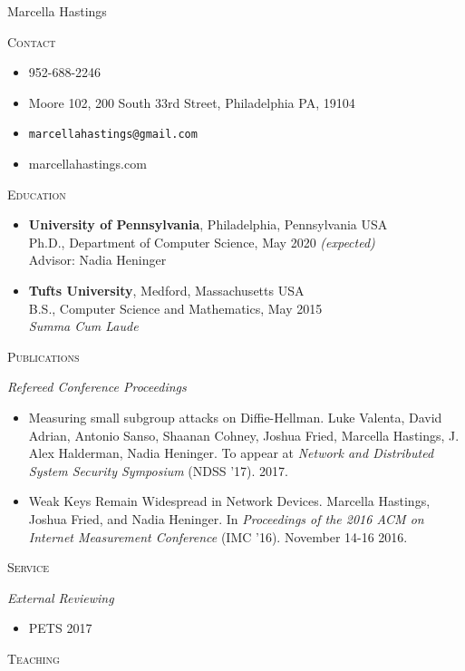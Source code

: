 \documentclass{article}
\begin{document}
Marcella Hastings

\hrulefill

\textsc{Contact}
\begin{itemize}[label={},noitemsep]
  \item 952-688-2246
  \item Moore 102, 200 South 33rd Street, Philadelphia PA, 19104
  \item \texttt{marcellahastings@gmail.com}
  \item marcellahastings.com
\end{itemize}

\textsc{Education}
\begin{itemize}[label={}]
  \item \textbf{University of Pennsylvania}, Philadelphia, Pennsylvania USA \\
    Ph.D., Department of Computer Science, May 2020 \textit{(expected)}\\
    Advisor: Nadia Heninger \\
    
  \item \textbf{Tufts University}, Medford, Massachusetts USA \\
    B.S., Computer Science and Mathematics, May 2015 \\
    \textit{Summa Cum Laude}
\end{itemize}

\textsc{Publications}

\textit{Refereed Conference Proceedings}
\begin{itemize}[label={}]
\item Measuring small subgroup attacks on Diffie-Hellman. Luke Valenta, David Adrian, Antonio Sanso, Shaanan Cohney, Joshua Fried, Marcella Hastings, J. Alex Halderman, Nadia Heninger. To appear at \textit{Network and Distributed System Security Symposium} (NDSS '17). 2017.
\item Weak Keys Remain Widespread in Network Devices. Marcella Hastings, Joshua Fried, and Nadia Heninger. In \textit{Proceedings of the 2016 ACM on Internet Measurement Conference} (IMC '16). November 14-16 2016.
\end{itemize}

\textsc{Service}

\textit{External Reviewing}
\begin{itemize}[label={}]
\item PETS 2017
\end{itemize}

\textsc{Teaching}
\end{document}
